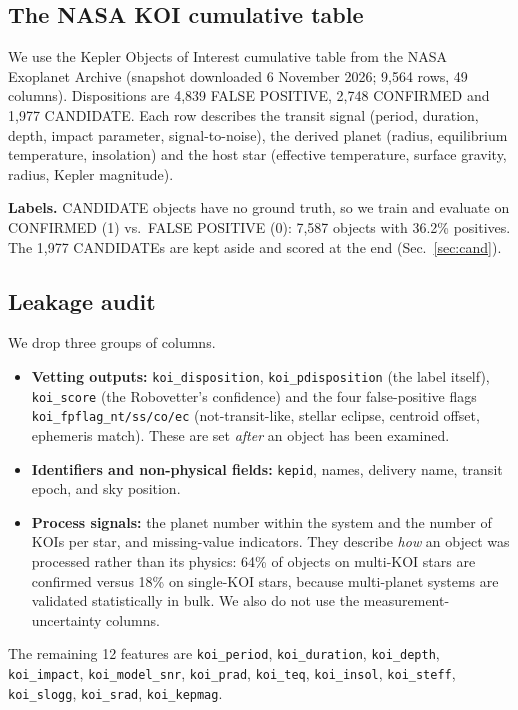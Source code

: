 \documentclass[11pt,a4paper]{article}
\newcommand{\code}[1]{\texttt{\small #1}}
\begin{document}
\subsection{The NASA KOI cumulative table}
We use the Kepler Objects of Interest cumulative table from the NASA Exoplanet Archive \citep{akeson2013} (snapshot downloaded 6 November 2026; 9,564 rows, 49 columns). Dispositions are 4,839 FALSE POSITIVE, 2,748 CONFIRMED and 1,977 CANDIDATE. Each row describes the transit signal (period, duration, depth, impact parameter, signal-to-noise), the derived planet (radius, equilibrium temperature, insolation) and the host star (effective temperature, surface gravity, radius, Kepler magnitude).

\textbf{Labels.} CANDIDATE objects have no ground truth, so we train and evaluate on CONFIRMED (1) vs.\ FALSE POSITIVE (0): 7,587 objects with 36.2\% positives. The 1,977 CANDIDATEs are kept aside and scored at the end (Sec.~\ref{sec:cand}).

\subsection{Leakage audit}\label{sec:leak}
We drop three groups of columns.
\begin{itemize}
\item \textbf{Vetting outputs:} \code{koi\_disposition}, \code{koi\_pdisposition} (the label itself), \code{koi\_score} (the Robovetter's confidence) and the four false-positive flags \code{koi\_fpflag\_nt/ss/co/ec} (not-transit-like, stellar eclipse, centroid offset, ephemeris match). These are set \emph{after} an object has been examined.
\item \textbf{Identifiers and non-physical fields:} \code{kepid}, names, delivery name, transit epoch, and sky position.
\item \textbf{Process signals:} the planet number within the system and the number of KOIs per star, and missing-value indicators. They describe \emph{how} an object was processed rather than its physics: 64\% of objects on multi-KOI stars are confirmed versus 18\% on single-KOI stars, because multi-planet systems are validated statistically in bulk. We also do not use the measurement-uncertainty columns.
\end{itemize}
The remaining 12 features are \code{koi\_period}, \code{koi\_duration}, \code{koi\_depth}, \code{koi\_impact}, \code{koi\_model\_snr}, \code{koi\_prad}, \code{koi\_teq}, \code{koi\_insol}, \code{koi\_steff}, \code{koi\_slogg}, \code{koi\_srad}, \code{koi\_kepmag}.
\end{document}
